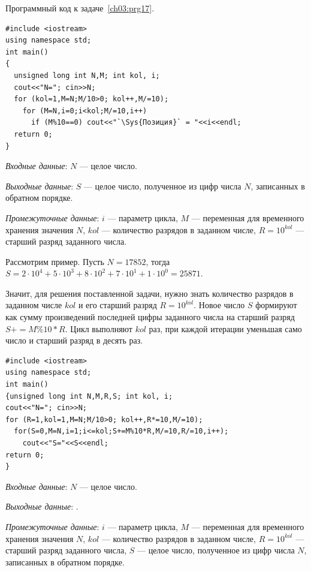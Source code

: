 Программный код к задаче~\ref{ch03:prg17}.
\begin{lstlisting}
#include <iostream>
using namespace std;
int main()
{
  unsigned long int N,M; int kol, i;
  cout<<"N="; cin>>N;
  for (kol=1,M=N;M/10>0; kol++,M/=10);
    for (M=N,i=0;i<kol;M/=10,i++)
      if (M%10==0) cout<<"`\Sys{Позиция}` = "<<i<<endl;
  return 0;
}
\end{lstlisting}


\emph{Входные данные}: $N$ --- целое число.

\emph{Выходные данные}: $S$ --- целое число, полученное из цифр числа $N$, записанных в обратном порядке.

\emph{Промежуточные данные}: $i$ --- параметр цикла, $M$ --- переменная для
временного хранения значения $N$, $kol$ --- количество разрядов в заданном числе, 
$R=10^{kol}$ --- старший разряд заданного числа.

Рассмотрим пример. Пусть $N=17852$, тогда 
$S=2\cdot 10^4+5\cdot 10^3+8\cdot 10^2+7\cdot 10^1+1\cdot 10^0=25871$.

Значит, для решения поставленной задачи, нужно знать количество
разрядов в заданном числе $kol$ и его старший разряд $R=10^{kol}$.
Новое число $S$ формируют как сумму произведений
последней цифры заданного числа на старший разряд $S+=M\%10*R$. Цикл выполняют
$kol$ раз, при каждой итерации уменьшая само число и старший разряд в десять раз.
\begin{lstlisting}
#include <iostream>
using namespace std;
int main()
{unsigned long int N,M,R,S; int kol, i;
cout<<"N="; cin>>N;
for (R=1,kol=1,M=N;M/10>0; kol++,R*=10,M/=10);
  for(S=0,M=N,i=1;i<=kol;S+=M%10*R,M/=10,R/=10,i++);
    cout<<"S="<<S<<endl;
return 0;
}
\end{lstlisting}

%

\emph{Входные данные}: $N$ --- целое число.

\emph{Выходные данные}: . 

\emph{Промежуточные данные}: $i$ --- параметр цикла, $M$ --- переменная для
временного хранения значения $N$, $kol$ --- количество разрядов в заданном числе,
$R=10^{kol}$ --- старший разряд заданного числа, $S$ --- целое число, полученное 
из цифр числа $N$, записанных в обратном порядке.

